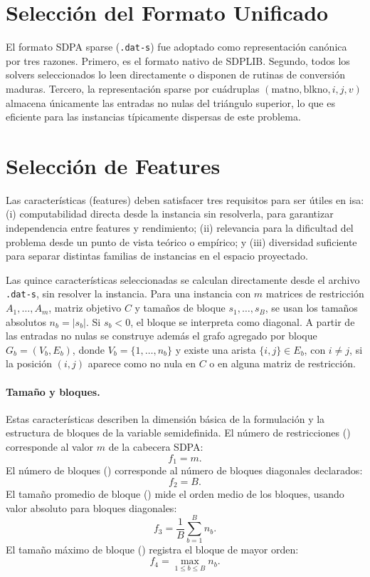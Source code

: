 \section{Selección del Formato Unificado}
\label{sec:seleccion_formato}

El formato SDPA sparse (\texttt{.dat-s}) \cite{SDPAFormat} fue adoptado como representación canónica por tres razones. Primero, es el formato nativo de
SDPLIB. Segundo, todos los solvers seleccionados lo leen directamente o
disponen de rutinas de conversión maduras. Tercero, la representación sparse por cuádruplas $(\text{matno}, \text{blkno}, i, j, v)$
almacena únicamente las entradas no nulas del triángulo superior, lo que es eficiente para las instancias típicamente dispersas de este problema.

\section{Selección de Features}
\label{sec:seleccion_features}

Las características (features) deben satisfacer tres requisitos para ser útiles en \acrshort{isa}: (i) computabilidad directa desde la instancia sin resolverla,
para garantizar independencia entre features y rendimiento; (ii) relevancia para la dificultad del problema desde un punto de vista teórico o empírico;
y (iii) diversidad suficiente para separar distintas familias de instancias en el espacio proyectado.

Las quince características seleccionadas se calculan directamente desde el archivo
\texttt{.dat-s}, sin resolver la instancia. Para una instancia con $m$ matrices de restricción $A_1,\ldots,A_m$, matriz objetivo
$C$ y tamaños de bloque $s_1,\ldots,s_B$, se usan los tamaños absolutos $n_b=|s_b|$. Si $s_b<0$, el bloque se interpreta como
diagonal. A partir de las entradas no nulas se construye además el grafo agregado por bloque $G_b=(V_b,E_b)$, donde
$V_b=\{1,\ldots,n_b\}$ y existe una arista $\{i,j\}\in E_b$, con $i\neq j$, si la posición $(i,j)$ aparece como no nula en
$C$ o en alguna matriz de restricción.

\newpage
\paragraph{Tamaño y bloques.}
Estas características describen la dimensión básica de la formulación y la estructura
de bloques de la variable semidefinida.
El número de restricciones () corresponde al valor $m$ de la
cabecera SDPA:
\[
    f_1 = m.
\]
El número de bloques () corresponde al número de bloques diagonales
declarados:
\[
    f_2 = B.
\]
El tamaño promedio de bloque () mide el orden medio de los
bloques, usando valor absoluto para bloques diagonales:
\[
    f_3 = \frac{1}{B}\sum_{b=1}^{B} n_b.
\]
El tamaño máximo de bloque () registra el bloque de mayor orden:
\[
    f_4 = \max_{1\leq b\leq B} n_b.
\]

